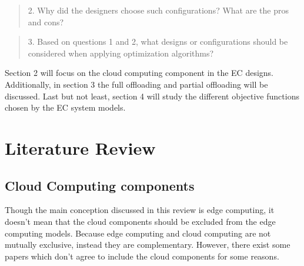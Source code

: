 \documentclass[a4paper,11pt]{article}
\begin{document}
        \begin{quote}
                2. Why did the designers choose such configurations? What are the pros and cons?
        \end{quote}
        \begin{quote}
                3. Based on questions 1 and 2, what designs or configurations should be considered when applying optimization algorithms?
        \end{quote}
\noindent Section 2 will focus on the cloud computing component in the EC designs. Additionally, in section 3 the full offloading and partial offloading will be discussed. Last but not least, section 4 will study the different objective functions chosen by the EC system models.
        







\section{Literature Review}
\subsection{Cloud Computing components}
Though the main conception discussed in this review is edge computing, it doesn't mean that the cloud components should be excluded from the edge computing models. Because edge computing and cloud computing are not mutually exclusive, instead they are complementary. However, there exist some papers which don't agree to include the cloud components for some reasons.\newline
\end{document}
